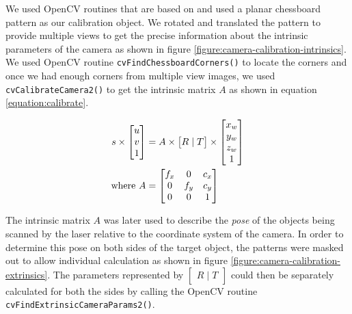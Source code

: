 We used OpenCV routines that are based on \cite{zhang:2000} \cite{brown:1971} and used a planar chessboard pattern as our calibration object. We rotated and translated the pattern to provide multiple views to get the precise information about the intrinsic parameters of the camera as shown in figure \ref{figure:camera-calibration-intrinsics}. 
We used OpenCV routine \texttt{cvFindChessboardCorners()} to locate the corners and once we had enough corners from multiple view images, we used \texttt{cvCalibrateCamera2()} to get the intrinsic matrix $A$ as shown in equation \ref{equation:calibrate}.


\begin{align}
	\label{equation:calibrate}				
	s \times 
	\begin{bmatrix}
		u \\ v \\	1 \\
	\end{bmatrix} &= A \times \begin{bmatrix}
															R \mid T
	 				  								\end{bmatrix} 
										 \times \begin{bmatrix}
															x_w \\ y_w \\ z_w \\ 1
														\end{bmatrix} \\
	\text{where}~	 
	A &= \begin{bmatrix}
					f_x & 0 & c_x \\
					0 & f_y & c_y \\
					0 & 0 & 1 \\										
 		 	 \end{bmatrix} \notag
\end{align}

The intrinsic matrix $A$ was later used to describe the \emph{pose} of the objects being scanned by the laser relative to the coordinate system of the camera. In order to determine this pose on both sides of the target object, the patterns were masked out to allow individual calculation as shown in figure \ref{figure:camera-calibration-extrinsics}. The parameters represented by $\begin{bmatrix}R \mid T\end{bmatrix}$ could then be separately calculated for both the sides by calling the OpenCV routine \texttt{cvFindExtrinsicCameraParams2()}. 

